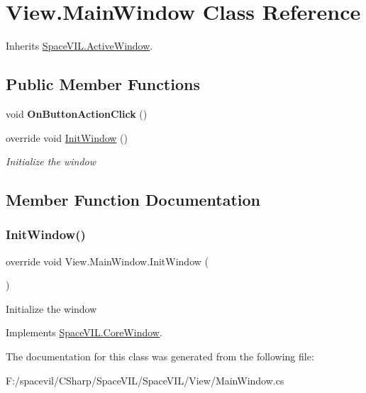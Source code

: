 \hypertarget{class_view_1_1_main_window}{}\section{View.\+Main\+Window Class Reference}
\label{class_view_1_1_main_window}


Inherits \mbox{\hyperlink{class_space_v_i_l_1_1_active_window}{Space\+V\+I\+L.\+Active\+Window}}.

\subsection*{Public Member Functions}
\begin{DoxyCompactItemize}
\item 
\mbox{\label{class_view_1_1_main_window_a002cef93db7a114f5118476662d545e8}} 
void {\bfseries On\+Button\+Action\+Click} ()
\item 
override void \mbox{\hyperlink{class_view_1_1_main_window_a1c3022ebb735b59e12ba1e9bc5cf3a90}{Init\+Window}} ()
\begin{DoxyCompactList}\small\item\em Initialize the window \end{DoxyCompactList}\end{DoxyCompactItemize}


\subsection{Member Function Documentation}
\mbox{\label{class_view_1_1_main_window_a1c3022ebb735b59e12ba1e9bc5cf3a90}} 
\subsubsection{\texorpdfstring{Init\+Window()}{InitWindow()}}
{\footnotesize\ttfamily override void View.\+Main\+Window.\+Init\+Window (\begin{DoxyParamCaption}{ }\end{DoxyParamCaption})\hspace{0.3cm}{\ttfamily [virtual]}}



Initialize the window 



Implements \mbox{\hyperlink{class_space_v_i_l_1_1_core_window_aa3cf4ac54d9651b1149584dc81042824}{Space\+V\+I\+L.\+Core\+Window}}.



The documentation for this class was generated from the following file\+:\begin{DoxyCompactItemize}
\item 
F\+:/spacevil/\+C\+Sharp/\+Space\+V\+I\+L/\+Space\+V\+I\+L/\+View/Main\+Window.\+cs\end{DoxyCompactItemize}
